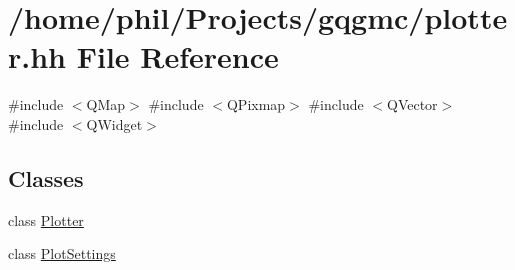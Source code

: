\hypertarget{plotter_8hh}{\section{/home/phil/\-Projects/gqgmc/plotter.hh \-File \-Reference}
\label{plotter_8hh}
}
{\ttfamily \#include $<$\-Q\-Map$>$}\*
{\ttfamily \#include $<$\-Q\-Pixmap$>$}\*
{\ttfamily \#include $<$\-Q\-Vector$>$}\*
{\ttfamily \#include $<$\-Q\-Widget$>$}\*
\subsection*{\-Classes}
\begin{DoxyCompactItemize}
\item 
class \hyperlink{class_plotter}{\-Plotter}
\item 
class \hyperlink{class_plot_settings}{\-Plot\-Settings}
\end{DoxyCompactItemize}
